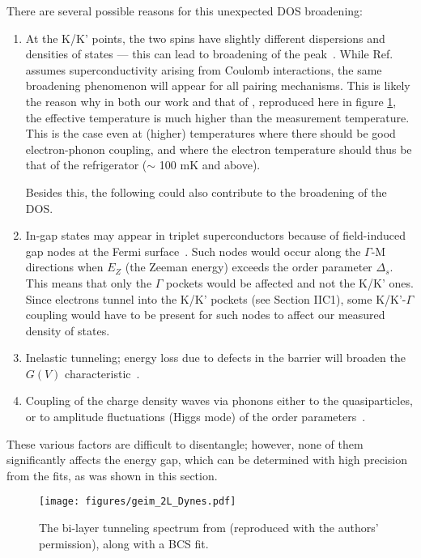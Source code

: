 \documentclass[showpacs,superscriptaddress,onecolumn,prb]{revtex4}
\begin{document}
There are several possible reasons for this unexpected DOS broadening: 
\begin{enumerate}
\item At the K/K' points, the two spins have slightly different dispersions and densities of states --- this can lead to broadening of the peak~\cite{marganska}. While Ref.~\cite{marganska} assumes superconductivity arising from Coulomb interactions, the same broadening phenomenon will appear for all pairing mechanisms. This is likely the reason why in both our work and that of \cite{khestanova2018unusual}, reproduced here in figure \ref{fig:geim2L}, the effective temperature is much higher than the measurement temperature. This is the case even at (higher) temperatures where there should be good electron-phonon coupling, and where the electron temperature should thus be that of the refrigerator ($\sim$ 100 mK and above). 

Besides this, the following could also contribute to the broadening of the DOS.
\item In-gap states may appear in triplet superconductors because of field-induced gap nodes at the Fermi surface~\cite{fischer2018}. Such nodes would occur along the $\Gamma$-M directions when $E_Z$ (the Zeeman energy) exceeds the order parameter $\Delta_s$. This means that only the $\Gamma$ pockets would be affected and not the K/K' ones. Since electrons tunnel into the K/K' pockets (see Section IIC1), some K/K'-$\Gamma$ coupling would have to be present for such nodes to affect our measured density of states. 
\item Inelastic tunneling; energy loss due to defects in the barrier will broaden the $G(V)$ characteristic~\cite{hlobil,reed}. 
\item Coupling of the charge density waves via phonons either to the quasiparticles, or to amplitude fluctuations (Higgs mode) of the order parameters~\cite{littlewood1982}. 
\end{enumerate}

These various factors are difficult to disentangle; however, none of them significantly affects the energy gap, which can be determined with high precision from the fits, as was shown in this section.

\begin{figure}[h!]
	\centering
	\texttt{[image: figures/geim\_2L\_Dynes.pdf]}
	\caption{The bi-layer tunneling spectrum from \cite{khestanova2018unusual} (reproduced with the authors' permission), along with a BCS fit.}
	\label{fig:geim2L}
\end{figure}
\end{document}
